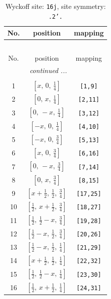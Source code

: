 \documentclass[fleqn,8pt]{jsarticle}
\begin{document}
\renewcommand{\arraystretch}{1.2}
\begin{longtable}{ccc}
\caption{Wyckoff site: {\tt 16j}, site symmetry: {\tt .2'.}}
 \\
 \hline \hline
No. & position & mapping \\ \hline \endfirsthead

\multicolumn{2}{l}{\tablename\ \thetable{}} \\
 \hline \hline
No. & position & mapping \\ \hline \endhead

 \hline \hline
\multicolumn{2}{r}{\footnotesize\it continued ...} \\ \endfoot

 \hline \hline
\multicolumn{2}{r}{} \\ \endlastfoot

1 & $\left[ x,\, 0,\, \frac{1}{4} \right]$ & {\tt [1,9]} \\ \hline
2 & $\left[ 0,\, x,\, \frac{1}{4} \right]$ & {\tt [2,11]} \\ \hline
3 & $\left[ 0,\, - x,\, \frac{1}{4} \right]$ & {\tt [3,12]} \\ \hline
4 & $\left[ - x,\, 0,\, \frac{1}{4} \right]$ & {\tt [4,10]} \\ \hline
5 & $\left[ - x,\, 0,\, \frac{3}{4} \right]$ & {\tt [5,13]} \\ \hline
6 & $\left[ x,\, 0,\, \frac{3}{4} \right]$ & {\tt [6,16]} \\ \hline
7 & $\left[ 0,\, - x,\, \frac{3}{4} \right]$ & {\tt [7,14]} \\ \hline
8 & $\left[ 0,\, x,\, \frac{3}{4} \right]$ & {\tt [8,15]} \\ \hline
9 & $\left[ x + \frac{1}{2},\, \frac{1}{2},\, \frac{3}{4} \right]$ & {\tt [17,25]} \\ \hline
10 & $\left[ \frac{1}{2},\, x + \frac{1}{2},\, \frac{3}{4} \right]$ & {\tt [18,27]} \\ \hline
11 & $\left[ \frac{1}{2},\, \frac{1}{2} - x,\, \frac{3}{4} \right]$ & {\tt [19,28]} \\ \hline
12 & $\left[ \frac{1}{2} - x,\, \frac{1}{2},\, \frac{3}{4} \right]$ & {\tt [20,26]} \\ \hline
13 & $\left[ \frac{1}{2} - x,\, \frac{1}{2},\, \frac{1}{4} \right]$ & {\tt [21,29]} \\ \hline
14 & $\left[ x + \frac{1}{2},\, \frac{1}{2},\, \frac{1}{4} \right]$ & {\tt [22,32]} \\ \hline
15 & $\left[ \frac{1}{2},\, \frac{1}{2} - x,\, \frac{1}{4} \right]$ & {\tt [23,30]} \\ \hline
16 & $\left[ \frac{1}{2},\, x + \frac{1}{2},\, \frac{1}{4} \right]$ & {\tt [24,31]} \\
\end{longtable}
\end{document}
